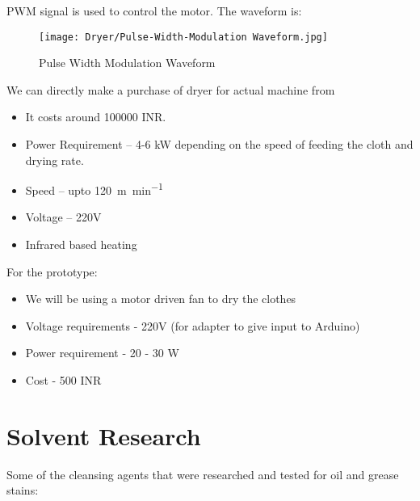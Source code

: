 \documentclass[table,french,english]{rapportCS}
\begin{document}
\newpage

PWM signal is used to control the motor. The waveform is:

\begin{figure}[h]
    \centering
    \texttt{[image: Dryer/Pulse-Width-Modulation Waveform.jpg]}
    \caption{Pulse Width Modulation Waveform}
    \label{fig:enter-label}
\end{figure}


We can directly make a purchase of dryer for actual machine from 

\href{https://www.indiamart.com/proddetail/tunnel-conveyor-drying-curing-conveyor-2850009254588.html}{}
\begin{itemize}
    \item It costs around 100000 INR.
    \item Power Requirement – 4-6 kW depending on the speed of feeding the cloth and drying rate.
    \item Speed – upto \SI{120}{\meter\per\minute}
    \item Voltage – 220V
    \item Infrared based heating
    
\end{itemize}
For the prototype:
\begin{itemize}
    \item We will be using a motor driven fan to dry the clothes
    \item Voltage requirements - 220V (for adapter to give input to Arduino)
    \item Power requirement - 20 - 30 W 
    \item Cost - 500 INR
\end{itemize}


\newpage

\section{Solvent Research}
Some of the cleansing agents that were researched and tested for oil and grease stains:
\end{document}
